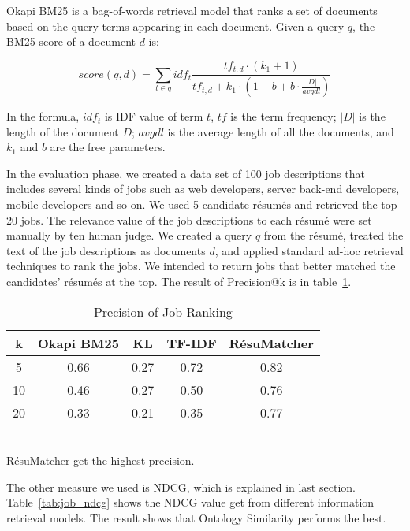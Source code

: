 Okapi BM25 is a bag-of-words retrieval model that ranks a set of documents based on the query terms appearing in each document. Given a query $q$, the BM25 score of a document $d$ is:

$$ score(q,d) = \sum_{ t \in q  }  idf_t \frac {tf_{t,d} \cdot(k_1 +1) }  {tf_{t,d} +k_1 \cdot ( 1-b + b\cdot \frac { \left | D \right |}{avgdl})}  $$

In the formula, $idf_t$ is IDF value of term $t$, $tf$ is the term frequency; $ |D|$ is the length of the document $D$; $avgdl$ is the average length of all the documents, and $k_1$ and $b$ are the free parameters.

In the evaluation phase, we created a data set of 100 job descriptions that includes several kinds of jobs such as web developers, server back-end developers, mobile developers and so on. We used 5 candidate r\'esum\'es and retrieved the top 20 jobs.  The relevance value of the job descriptions to each r\'esum\'e were set manually by ten human judge. We created a query $q$ from the r\'esum\'e, treated the text of the job descriptions as documents $d$, and applied standard ad-hoc retrieval techniques to rank the jobs. We intended to return jobs that better matched the candidates' r\'esum\'es at the top. The result of Precision@k is in table~\ref{tab:job_precision}.


\begin{table}[ht]
\caption{Precision of Job Ranking } %
\centering %
\begin{tabular}{    | c | c | c | c | c |  }
 \hline
       k     & Okapi BM25 & KL    & TF-IDF   & R\'esuMatcher  \\
 \hline
       5     & 0.66       & 0.27  & 0.72     & 0.82   \\
 \hline
       10    & 0.46       & 0.27  & 0.50     & 0.76   \\
 \hline
       20    & 0.33       & 0.21  & 0.35     & 0.77   \\
 \hline

\end{tabular}
\label{tab:job_precision} %
\\R\'esuMatcher get the highest precision.
\end{table}

The other measure we used is NDCG, which is explained in last section. Table~\ref{tab:job_ndcg} shows the NDCG value get from different information retrieval models. The result shows that Ontology Similarity  performs the best.

